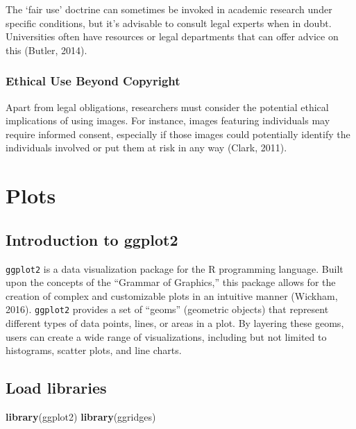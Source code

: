\documentclass[
  b5paper]{book}
\newenvironment{Shaded}{\begin{snugshade}}{\end{snugshade}}
\newcommand{\FunctionTok}[1]{\textcolor[rgb]{0.13,0.29,0.53}{\textbf{#1}}}
\newcommand{\NormalTok}[1]{#1}
\begin{document}
The `fair use' doctrine can sometimes be invoked in academic research under specific conditions, but it's advisable to consult legal experts when in doubt. Universities often have resources or legal departments that can offer advice on this (Butler, 2014).

\hypertarget{ethical-use-beyond-copyright}{%
\subsubsection*{Ethical Use Beyond Copyright}\label{ethical-use-beyond-copyright}}

Apart from legal obligations, researchers must consider the potential ethical implications of using images. For instance, images featuring individuals may require informed consent, especially if those images could potentially identify the individuals involved or put them at risk in any way (Clark, 2011).

\hypertarget{plots-1}{%
\section{Plots}\label{plots-1}}

\hypertarget{introduction-to-ggplot2}{%
\subsection*{Introduction to ggplot2}\label{introduction-to-ggplot2}}

\texttt{ggplot2} is a data visualization package for the R programming language. Built upon the concepts of the ``Grammar of Graphics,'' this package allows for the creation of complex and customizable plots in an intuitive manner (Wickham, 2016). \texttt{ggplot2} provides a set of ``geoms'' (geometric objects) that represent different types of data points, lines, or areas in a plot. By layering these geoms, users can create a wide range of visualizations, including but not limited to histograms, scatter plots, and line charts.

\hypertarget{load-libraries}{%
\subsection*{Load libraries}\label{load-libraries}}

\begin{Shaded}
\begin{Highlighting}[]
\FunctionTok{library}\NormalTok{(ggplot2)}
\FunctionTok{library}\NormalTok{(ggridges)}
\end{Highlighting}
\end{Shaded}
\end{document}
